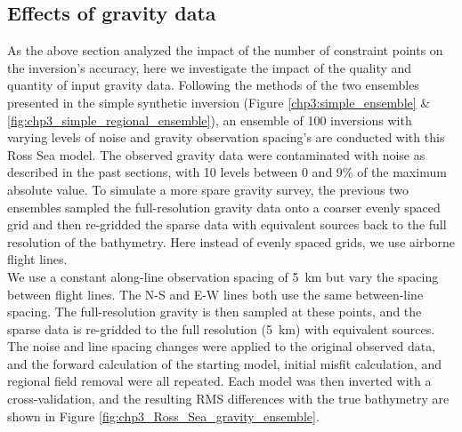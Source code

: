 \subsection{Effects of gravity data} \label{chp3:Ross_Sea_gravity_ensemble}

As the above section analyzed the impact of the number of constraint points on the inversion's accuracy, here we investigate the impact of the quality and quantity of input gravity data. Following the methods of the two ensembles presented in the simple synthetic inversion (Figure \ref{chp3:simple_ensemble} \& \ref{fig:chp3_simple_regional_ensemble}), an ensemble of 100 inversions with varying levels of noise and gravity observation spacing's are conducted with this Ross Sea model. The observed gravity data were contaminated with noise as described in the past sections, with 10 levels between 0 and 9\% of the maximum absolute value. To simulate a more spare gravity survey, the previous two ensembles sampled the full-resolution gravity data onto a coarser evenly spaced grid and then re-gridded the sparse data with equivalent sources back to the full resolution of the bathymetry. Here instead of evenly spaced grids, we use airborne flight lines. \\

We use a constant along-line observation spacing of 5~km but vary the spacing between flight lines. The N-S and E-W lines both use the same between-line spacing. The full-resolution gravity is then sampled at these points, and the sparse data is re-gridded to the full resolution (5~km) with equivalent sources. The noise and line spacing changes were applied to the original observed data, and the forward calculation of the starting model, initial misfit calculation, and regional field removal were all repeated. Each model was then inverted with a cross-validation, and the resulting RMS differences with the true bathymetry are shown in Figure \ref{fig:chp3_Ross_Sea_gravity_ensemble}. 

